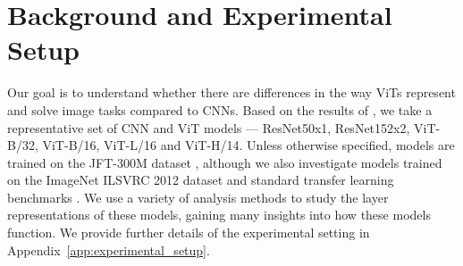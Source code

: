 \documentclass{article}
\begin{document}
\vspace{-0.25em}
\section{Background and Experimental Setup}
\vspace{-0.25em}
\label{sec:background}
Our goal is to understand whether there are differences in the way ViTs represent and solve image tasks compared to CNNs. Based on the results of \citet{dosovitskiy2020image}, we take a representative set of CNN and ViT models --- ResNet50x1, ResNet152x2, ViT-B/32, ViT-B/16, ViT-L/16 and ViT-H/14. Unless otherwise specified, models are trained on the JFT-300M dataset \cite{sun2017revisiting}, although we also investigate models trained on the ImageNet ILSVRC 2012 dataset \cite{deng2009imagenet,russakovsky2015imagenet} and standard transfer learning benchmarks \cite{zhai2019visual, dosovitskiy2020image}.
We use a variety of analysis methods to study the layer representations of these models, gaining many insights into how these models function. 
We provide further details of the experimental setting in Appendix~\ref{app:experimental_setup}.
\end{document}
